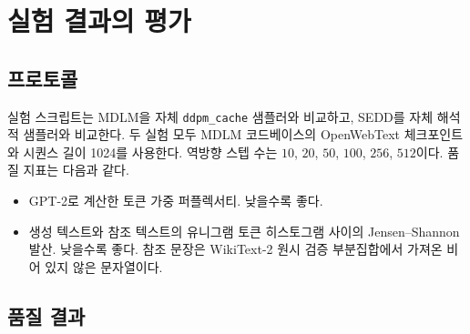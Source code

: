 \section{실험 결과의 평가}

\subsection{프로토콜}

실험 스크립트는 MDLM을 자체 \texttt{ddpm\_cache} 샘플러와 비교하고, SEDD를 자체 해석적
샘플러와 비교한다. 두 실험 모두 MDLM 코드베이스의 OpenWebText 체크포인트와 시퀀스 길이 1024를
사용한다. 역방향 스텝 수는 $10$, $20$, $50$, $100$, $256$, $512$이다. 품질 지표는 다음과 같다.
\begin{itemize}
  \item GPT-2로 계산한 토큰 가중 퍼플렉서티. 낮을수록 좋다.
  \item 생성 텍스트와 참조 텍스트의 유니그램 토큰 히스토그램 사이의 Jensen--Shannon 발산.
  낮을수록 좋다. 참조 문장은 WikiText-2 원시 검증 부분집합에서 가져온 비어 있지 않은 문자열이다.
\end{itemize}

\subsection{품질 결과}

